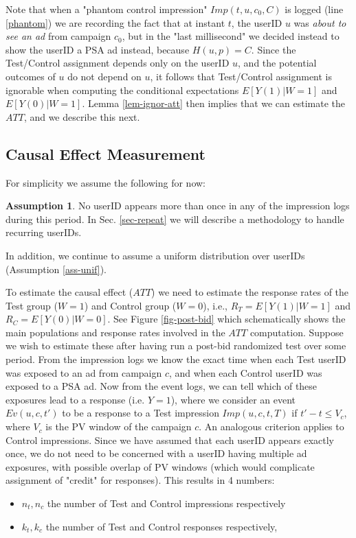 \documentclass[11pt,a4paper]{article}
\theoremstyle{definition}
\theoremstyle{remark}
\theoremstyle{definition}
\theoremstyle{definition}
\theoremstyle{definition}
\theoremstyle{definition}
\theoremstyle{definition}
\theoremstyle{definition}
\newtheorem{assumption}{Assumption
}[section]
\begin{document}
Note that when a "phantom control impression" $Imp(t, u, c_0, C)$ is logged (line \ref{phantom}) we are recording the fact that at instant $t$, the userID $u$ was {\em about to see an ad} from campaign $c_0$, but in the "last millisecond" we decided instead to show the userID a PSA ad instead, because $H(u,p) = C$. Since the Test/Control assignment depends only on the userID $u$, and the potential outcomes of $u$ do not depend on $u$, it follows that Test/Control assignment is ignorable when computing the conditional expectations $E[Y(1) | W=1]$ and $E[Y(0) | W=1]$. Lemma \ref{lem-ignor-att} then implies that we can estimate the $ATT$, and we describe this next.

\subsection{Causal Effect Measurement}\label{sub-causal-post-bid}

For simplicity we assume the following for now:
\begin{assumption} \label{assum-user-once}
	No userID appears more than once in any of the impression logs during this period. In Sec. \ref{sec-repeat} we will describe a methodology to handle recurring userIDs.
\end{assumption}

In addition, we continue to assume a uniform distribution over userIDs (Assumption \ref{ass-unif}).



To estimate the causal effect ($ATT$) we need to estimate the response rates of the Test group ($W=1$) and Control group ($W=0$), i.e., 
$R_T = E[Y(1) | W=1]$ and $R_C = E[Y(0)|W=0]$. 
See Figure \ref{fig-post-bid} which schematically shows the main populations and response rates involved in the $ATT$ computation.
Suppose we wish to estimate these after having run a post-bid randomized test over some period. From the impression logs we know the exact time when each Test userID was exposed to an ad from campaign $c$, and 
when each Control userID was exposed to a PSA ad. Now from the event logs, we can tell which of these exposures lead to a response (i.e. $Y=1$), where we consider an event $Ev(u,c,t')$ to be a response to a Test impression $Imp(u,c,t,T)$ if $t'-t \leq V_c$, where $V_c$ is the PV window of the campaign $c$. An analogous criterion applies to Control impressions. Since we have assumed that each userID appears exactly once, we do not need to be concerned with a userID having multiple ad exposures, with possible overlap of PV windows (which would complicate assignment of "credit" for responses). This results in 4 numbers: 
\begin{itemize}
	\item $n_t, n_c$ the number of Test and Control impressions respectively
	\item $k_t, k_c$ the number of Test and Control responses respectively,
\end{itemize}
\end{document}
